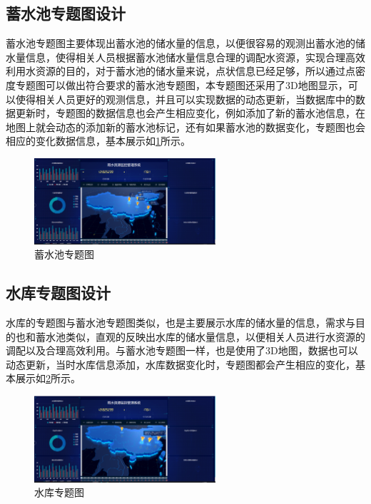 \subsection{蓄水池专题图设计}
蓄水池专题图主要体现出蓄水池的储水量的信息，以便很容易的观测出蓄水池的储水量信息，使得相关人员根据蓄水池储水量信息合理的调配水资源，实现合理高效利用水资源的目的，对于蓄水池的储水量来说，点状信息已经足够，所以通过点密度专题图可以做出符合要求的蓄水池专题图，本专题图还采用了3D地图显示，可以使得相关人员更好的观测信息，并且可以实现数据的动态更新，当数据库中的数据更新时，专题图的数据信息也会产生相应变化，例如添加了新的蓄水池信息，在地图上就会动态的添加新的蓄水池标记，还有如果蓄水池的数据变化，专题图也会相应的变化数据信息，基本展示如\ref{fig:xushuici}所示。
\begin{figure}[!htb]%
	\centering
	\includegraphics[width=0.60\textwidth]{figs/xushuici.png}
	\caption{蓄水池专题图}
	\label{fig:xushuici}
\end{figure}
\subsection{水库专题图设计}
水库的专题图与蓄水池专题图类似，也是主要展示水库的储水量的信息，需求与目的也和蓄水池类似，直观的反映出水库的储水量信息，以便相关人员进行水资源的调配以及合理高效利用。与蓄水池专题图一样，也是使用了3D地图，数据也可以动态更新，当时水库信息添加，水库数据变化时，专题图都会产生相应的变化，基本展示如\ref{fig:shuiku}所示。
\begin{figure}[!htb]%
	\centering
	\includegraphics[width=0.60\textwidth]{figs/shuiku.png}
	\caption{水库专题图}
	\label{fig:shuiku}
\end{figure}
